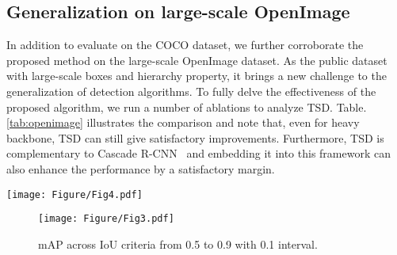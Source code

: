 \documentclass[10pt,twocolumn,letterpaper]{article}
\def \algname{TSD}
\begin{document}
\subsection{Generalization on large-scale \bf{OpenImage}}
In addition to evaluate on the COCO dataset, we further corroborate the proposed method on the large-scale OpenImage dataset.
As the public dataset with large-scale boxes and hierarchy property, it brings a new challenge to the generalization of detection algorithms. To fully delve the effectiveness of the proposed algorithm, we run a number of ablations to analyze \algname{}.
Table.\ref{tab:openimage} illustrates the comparison and note that, even for heavy backbone, \algname{} can still give satisfactory improvements. 
Furthermore, \algname{} is complementary to Cascade R-CNN~\cite{cai2018cascade} and embedding it into this framework can also enhance the performance by a satisfactory margin.





\begin{figure*}[h]
  \centering 
  \texttt{[image: Figure/Fig4.pdf]}
  \caption{Visualization of the learnt $\hat{P}_r$ and $\hat{P}_c$ on examples from the COCO \emph{minival} set. The first row indicates the proposal $P$ (yellow box) and the derived $\hat{P}_r$ (red box) and $\hat{P}_c$ (pink point, center point in each grid). The second row is the final detected boxes where the white box is ground-truth. \algname{} deposes the false positives in the first two columns and in other columns, it regresses more precise boxes.} 
  \label{fig:vis}
\end{figure*}

\begin{figure}[h]
  \centering 
  \texttt{[image: Figure/Fig3.pdf]}
  \caption{mAP across IoU criteria from 0.5 to 0.9 with 0.1
interval.} 
  \label{fig:iou}
\end{figure}
\end{document}
